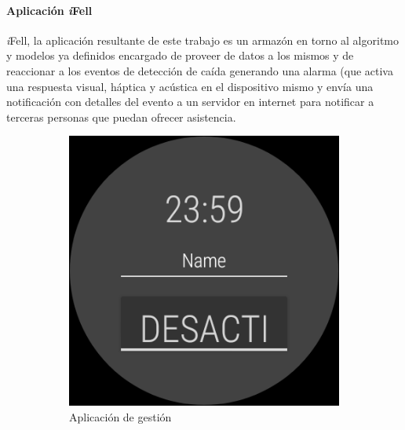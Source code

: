 \documentclass[11pt,a4paper,spanish,twocolumn]{article}
\def\ifell/{\textsl{\textsf{i}}\textsf{Fell}}
\begin{document}
\paragraph{Aplicación \ifell/}

\ifell/, la aplicación resultante de este trabajo es un armazón en torno al algoritmo y modelos ya definidos encargado de proveer de datos a los mismos y de reaccionar a los eventos de detección de caída generando una alarma (que activa una respuesta visual, háptica y acústica en el dispositivo mismo y envía una notificación con detalles del evento a un servidor en internet para notificar a terceras personas que puedan ofrecer asistencia.

\begin{figure}[!ht]
  \centering
  \begin{subfigure}[b]{0.48\columnwidth}
      \centering
      \includegraphics[width=\linewidth]{img/appActivity.png}
      \caption{\footnotesize Aplicación de gestión}
      \label{fig:uiActivity}
  \end{subfigure}
  \hfill
  \begin{subfigure}[b]{0.48\columnwidth}
      \centering

\end{subfigure}
\end{figure}
\end{document}
